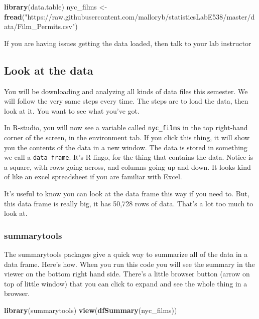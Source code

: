 \documentclass[
]{book}
\newenvironment{Shaded}{\begin{snugshade}}{\end{snugshade}}
\newcommand{\FunctionTok}[1]{\textcolor[rgb]{0.13,0.29,0.53}{\textbf{#1}}}
\newcommand{\NormalTok}[1]{#1}
\newcommand{\OtherTok}[1]{\textcolor[rgb]{0.56,0.35,0.01}{#1}}
\newcommand{\StringTok}[1]{\textcolor[rgb]{0.31,0.60,0.02}{#1}}
\begin{document}
\begin{Shaded}
\begin{Highlighting}[]
\FunctionTok{library}\NormalTok{(data.table)}
\NormalTok{nyc\_films }\OtherTok{\textless{}{-}} \FunctionTok{fread}\NormalTok{(}\StringTok{"https://raw.githubusercontent.com/malloryb/statisticsLabE538/master/data/Film\_Permits.csv"}\NormalTok{)}
\end{Highlighting}
\end{Shaded}

If you are having issues getting the data loaded, then talk to your lab instructor

\hypertarget{look-at-the-data}{%
\subsection{Look at the data}\label{look-at-the-data}}

You will be downloading and analyzing all kinds of data files this semester. We will follow the very same steps every time. The steps are to load the data, then look at it. You want to see what you've got.

In R-studio, you will now see a variable called \texttt{nyc\_films} in the top right-hand corner of the screen, in the environment tab. If you click this thing, it will show you the contents of the data in a new window. The data is stored in something we call a \texttt{data\ frame}. It's R lingo, for the thing that contains the data. Notice is a square, with rows going across, and columns going up and down. It looks kind of like an excel spreadsheet if you are familiar with Excel.

It's useful to know you can look at the data frame this way if you need to. But, this data frame is really big, it has 50,728 rows of data. That's a lot too much to look at.

\hypertarget{summarytools}{%
\subsubsection{summarytools}\label{summarytools}}

The summarytools packages give a quick way to summarize all of the data in a data frame. Here's how. When you run this code you will see the summary in the viewer on the bottom right hand side. There's a little browser button (arrow on top of little window) that you can click to expand and see the whole thing in a browser.

\begin{Shaded}
\begin{Highlighting}[]
\FunctionTok{library}\NormalTok{(summarytools)}
\FunctionTok{view}\NormalTok{(}\FunctionTok{dfSummary}\NormalTok{(nyc\_films))}
\end{Highlighting}
\end{Shaded}
\end{document}

